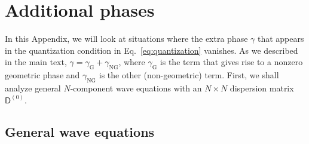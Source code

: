 \section{Additional phases}
\label{app:additional_phase}

In this Appendix, we will look at situations where the extra phase $\gamma$ that appears in the quantization condition in Eq.~\eqref{eq:quantization} vanishes.
As we described in the main text, $\gamma = \gamma_{\text{G}} + \gamma_{\text{NG}}$, where $\gamma_{\text{G}}$ is the term that gives rise to a nonzero geometric phase and $\gamma_{\text{NG}}$ is the other (non-geometric) term.
First, we shall analyze general $N$-component wave equations with an $N\times N$ dispersion matrix $\mathsf{D}^{(0)}$.

\subsection{General wave equations}
\label{app:genwave}

